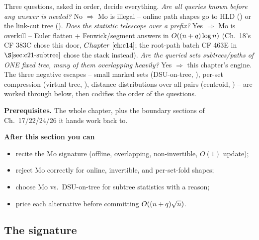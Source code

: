 \begin{topicintro}
Three questions, asked in order, decide everything.  \emph{Are all queries
known before any answer is needed?}  No \(\Rightarrow\) Mo is illegal -- online
path shapes go to HLD () or the link-cut tree ().
\emph{Does the statistic telescope over a prefix?}  Yes \(\Rightarrow\) Mo is
overkill -- Euler flatten + Fenwick/segment answers in
\(O((n+q)\log n)\) (Ch.~18's CF 383C chose this door, \(\chref{c14}\); the
root-path batch CF 463E in \(\secref{c21-subtree}\) chose the stack instead).
\emph{Are the queried sets subtrees/paths of ONE fixed tree, many of them
overlapping heavily?}  Yes \(\Rightarrow\) this chapter's engine.  The three
negative escapes -- small marked sets (DSU-on-tree, ), per-set
compression (virtual tree, ), distance distributions over all pairs
(centroid, ) -- are worked through below, then 
codifies the order of the questions.

\textbf{Prerequisites.} The whole chapter, plus the boundary sections of
Ch.~17/22/24/26 it hands work back to.

\textbf{After this section you can}
\begin{itemize}[nosep]
  \item recite the Mo signature (offline, overlapping, non-invertible, \(O(1)\) update); \hfill{}
  \item reject Mo correctly for online, invertible, and per-set-fold shapes; \hfill{}
  \item choose Mo vs.\ DSU-on-tree for subtree statistics with a reason; \hfill{}
  \item price each alternative before committing \(O((n+q)\sqrt n)\). \hfill{}
\end{itemize}
\end{topicintro}

\subsection{The signature}

